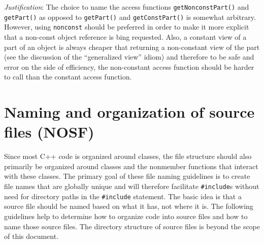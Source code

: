 \begin{enumerate}
{}\textit{Justification}: The choice to name the access functions
{}\texttt{getNonconstPart()} and {}\texttt{getPart()} as opposed to
{}\texttt{getPart()} and {}\texttt{getConstPart()} is somewhat arbitrary.
However, using {}\texttt{nonconst} should be preferred in order to make it
more explicit that a non-const object reference is bing requested.  Also, a
constant view of a part of an object is always cheaper that returning a
non-constant view of the part (see the discussion of the ``generalized view''
idiom) and therefore to be safe and error on the side of efficiency, the
non-constant access function should be harder to call than the constant access
function.

\end{enumerate}

%
\section{Naming and organization of source files (NOSF)}
%

Since most C++ code is organized around classes, the file structure should
also primarily be organized around classes and the nonmember functions that
interact with these classes.  The primary goal of these file naming guidelines
is to create file names that are globally unique and will therefore facilitate
{}\texttt{\#include}s without need for directory paths in the
{}\texttt{\#include} statement.  The basic idea is that a source file should
be named based on what it has, not where it is.  The following guidelines help
to determine how to organize code into source files and how to name those
source files.  The directory structure of source files is beyond the scope of
this document.

